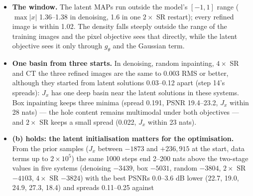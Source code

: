 \documentclass[11pt]{article}
\begin{document}
\begin{itemize}
        box-inpainting restart sat above it at $1.13$); stage 2 moves it up
        --- to the truth's level where the data are informative (box
        $0.93$, random inpainting $1.00$, CT $0.94$; truth $1.00$, $0.97$,
        $1.02$) and \emph{past} it where they are not (denoising $1.25$,
        $2\times$ SR $1.18$, $4\times$ SR $2.7$; truth $0.99$, $0.85$,
        $0.75$). In random inpainting
        the 305 observed pixels pin the image and the log-determinant only
        removes the speckle the latent MAP had put into the 719 missing
        ones: $+2.3$ dB. In denoising and $4\times$ SR the log-determinant
        overrules the likelihood: the refined image fits $y$ worse than the
        truth does, and loses 0.6 and 3.1 dB. The latent MAP's
        noise-fitting and the pixel MAP's over-smoothing are the two
        failures of the two objectives, in opposite directions, and neither
        is the posterior mean (step 10's, at ChestMNIST, beat both MAPs by
        five dB).
  \item \textbf{The window.} The latent MAPs run outside the model's
        $[-1, 1]$ range ($\max|x|$ 1.36--1.38 in denoising, 1.6 in one
        $2\times$ SR restart); every refined image is within 1.02. The
        density falls steeply outside the range of the training images and
        the pixel objective sees that directly, while the latent objective
        sees it only through $g_\theta$ and the Gaussian term.
  \item \textbf{One basin from three starts.} In denoising, random
        inpainting, $4\times$ SR and CT the three refined images are the
        same to 0.003 RMS or better, although they started from latent
        solutions 0.03--0.12 apart (step 14's spreads): $J_x$ has one deep
        basin near the latent solutions in these systems. Box inpainting
        keeps three minima (spread 0.191, PSNR 19.4--23.2, $J_x$ within 28
        nats) --- the hole content remains multimodal under both objectives
        --- and $2\times$ SR keeps a small spread (0.022, $J_x$ within 23
        nats).
  \item \textbf{(b) holds: the latent initialisation matters for the
        optimisation.} From the prior samples ($J_x$ between $-1873$ and
        $+236{,}915$ at the start, data terms up to $2 \times 10^{5}$) the
        same 1000 steps end 2--200 nats above the two-stage values in five
        systems (denoising $-3439$, box $-5031$, random $-3804$, $2\times$
        SR $-4103$, $4\times$ SR $-3824$) with the best PSNRs 0.0--3.6 dB
        lower (22.7, 19.0, 24.9, 27.3, 18.4) and spreads 0.11--0.25 against

\end{itemize}
\end{document}
